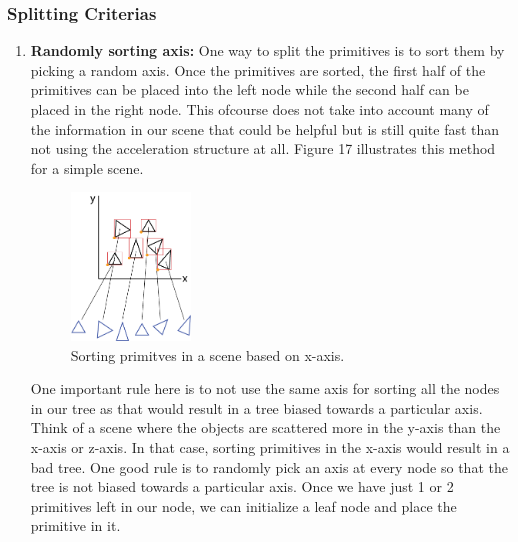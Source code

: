 \documentclass[11pt,a4paper]{article}
\begin{document}
\subsubsection{Splitting Criterias}
\begin{enumerate}
\item \textbf{Randomly sorting axis:}
One way to split the primitives is to sort them by picking a random axis. Once the primitives are sorted, the first half of the primitives can be placed into the left node while the second half can be placed in the right node. This ofcourse does not take into account many of the information in our scene that could be helpful but is still quite fast than not using the acceleration structure at all. Figure 17 illustrates this method for a simple scene.
\begin{figure}[H]
	\centering
	\captionsetup{justification=centering,margin=2cm}
	\includegraphics[width=0.3\textwidth]{sorting_bvh}
	\caption{Sorting primitves in a scene based on x-axis.}
\end{figure}
One important rule here is to not use the same axis for sorting all the nodes in our tree as that would result in a tree biased towards a particular axis. Think of a scene where the objects are scattered more in the y-axis than the x-axis or z-axis. In that case, sorting primitives in the x-axis would result in a bad tree. One good rule is to randomly pick an axis at every node so that the tree is not biased towards a particular axis. Once we have just 1 or 2 primitives left in our node, we can initialize a leaf node and place the primitive in it.


\end{enumerate}
\end{document}

